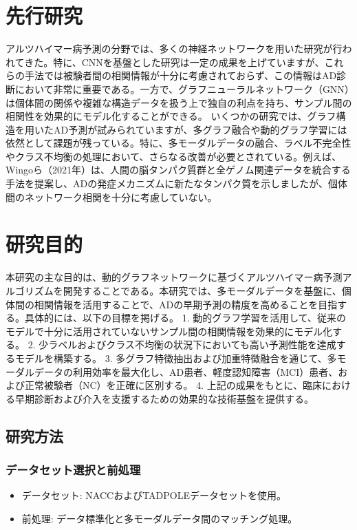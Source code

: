 \documentclass[twocolumn]{article}
\begin{document}
\section{先行研究}
アルツハイマー病予測の分野では、多くの神経ネットワークを用いた研究が行われてきた。特に、CNNを基盤とした研究は一定の成果を上げていますが、これらの手法では被験者間の相関情報が十分に考慮されておらず、この情報はAD診断において非常に重要である。一方で、グラフニューラルネットワーク（GNN）は個体間の関係や複雑な構造データを扱う上で独自の利点を持ち、サンプル間の相関性を効果的にモデル化することができる。
いくつかの研究では、グラフ構造を用いたAD予測が試みられていますが、多グラフ融合や動的グラフ学習には依然として課題が残っている。特に、多モーダルデータの融合、ラベル不完全性やクラス不均衡の処理において、さらなる改善が必要とされている。例えば、Wingoら（2021年）は、人間の脳タンパク質群と全ゲノム関連データを統合する手法を提案し、ADの発症メカニズムに新たなタンパク質を示しましたが、個体間のネットワーク相関を十分に考慮していない。

\section{研究目的}
本研究の主な目的は、動的グラフネットワークに基づくアルツハイマー病予測アルゴリズムを開発することである。本研究では、多モーダルデータを基盤に、個体間の相関情報を活用することで、ADの早期予測の精度を高めることを目指する。具体的には、以下の目標を掲げる。
1.	動的グラフ学習を活用して、従来のモデルで十分に活用されていないサンプル間の相関情報を効果的にモデル化する。
2.	少ラベルおよびクラス不均衡の状況下においても高い予測性能を達成するモデルを構築する。
3.	多グラフ特徴抽出および加重特徴融合を通じて、多モーダルデータの利用効率を最大化し、AD患者、軽度認知障害（MCI）患者、および正常被験者（NC）を正確に区別する。
4.	上記の成果をもとに、臨床における早期診断および介入を支援するための効果的な技術基盤を提供する。


\subsection{研究方法}
\subsubsection{データセット選択と前処理}
\begin{itemize}
	\item 	データセット: NACCおよびTADPOLEデータセットを使用。
	\item 	前処理: データ標準化と多モーダルデータ間のマッチング処理。
\end{itemize}
\end{document}
